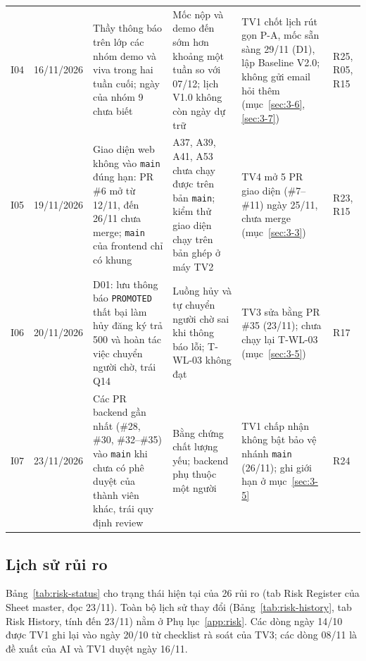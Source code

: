 \begin{longtable}{L{0.7cm}L{2.0cm}L{3.2cm}L{2.5cm}L{4.4cm}L{1.0cm}}
I04 & 16/11/2026 & Thầy thông báo trên lớp các nhóm demo và viva trong hai tuần cuối; ngày của nhóm 9 chưa biết & Mốc nộp và demo đến sớm hơn khoảng một tuần so với 07/12; lịch V1.0 không còn ngày dự trữ & TV1 chốt lịch rút gọn P-A, mốc sẵn sàng 29/11 (D1), lập Baseline V2.0; không gửi email hỏi thêm (mục~\ref{sec:3-6}, \ref{sec:3-7}) & R25, R05, R15 \\
I05 & 19/11/2026 & Giao diện web không vào \texttt{main} đúng hạn: PR \#6 mở từ 12/11, đến 26/11 chưa merge; \texttt{main} của frontend chỉ có khung & A37, A39, A41, A53 chưa chạy được trên bản \texttt{main}; kiểm thử giao diện chạy trên bản ghép ở máy TV2 & TV4 mở 5 PR giao diện (\#7--\#11) ngày 25/11, chưa merge (mục~\ref{sec:3-3}) & R23, R15 \\
I06 & 20/11/2026 & D01: lưu thông báo \texttt{PROMOTED} thất bại làm hủy đăng ký trả 500 và hoàn tác việc chuyển người chờ, trái Q14 & Luồng hủy và tự chuyển người chờ sai khi thông báo lỗi; T-WL-03 không đạt & TV3 sửa bằng PR \#35 (23/11); chưa chạy lại T-WL-03 (mục~\ref{sec:3-5}) & R17 \\
I07 & 23/11/2026 & Các PR backend gần nhất (\#28, \#30, \#32--\#35) vào \texttt{main} khi chưa có phê duyệt của thành viên khác, trái quy định review & Bằng chứng chất lượng yếu; backend phụ thuộc một người & TV1 chấp nhận không bật bảo vệ nhánh \texttt{main} (26/11); ghi giới hạn ở mục~\ref{sec:3-5} & R24 \\
\end{longtable}
\endgroup

\subsection*{Lịch sử rủi ro}
Bảng~\ref{tab:risk-status} cho trạng thái hiện tại của 26 rủi ro (tab Risk Register của Sheet master, đọc 23/11). Toàn bộ lịch sử thay đổi (Bảng~\ref{tab:risk-history}, tab Risk History, tính đến 23/11) nằm ở Phụ lục~\ref{app:risk}. Các dòng ngày 14/10 được TV1 ghi lại vào ngày 20/10 từ checklist rà soát của TV3; các dòng 08/11 là đề xuất của AI và TV1 duyệt ngày 16/11.

